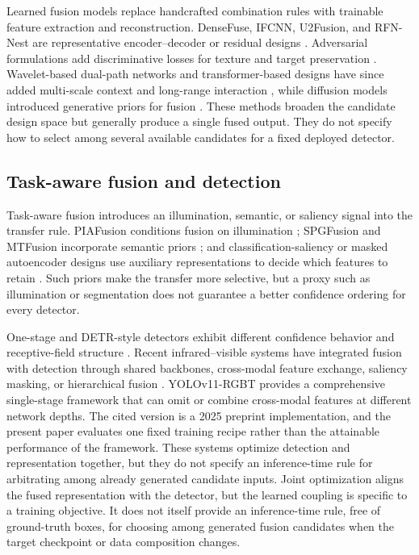 \documentclass[preprint,11pt]{elsarticle}
\begin{document}
Learned fusion models replace handcrafted combination rules with trainable
feature extraction and reconstruction. DenseFuse, IFCNN, U2Fusion, and RFN-Nest
are representative encoder--decoder or residual designs
\cite{li2019densefuse,zhang2020,xu2022u2fusion,li2021rfn}. Adversarial
formulations add discriminative losses for texture and target preservation
\cite{ma2019fusiongan,hou2021ssgan,yi2021dfpgan,song2022tdgan}.
Wavelet-based dual-path networks and transformer-based designs have since added
multi-scale context and long-range interaction
\cite{liu2023dualpath,hao2022vdfefuse,yang2023dglt,an2024mras}, while diffusion
models introduced generative priors for fusion \cite{yi2024diffif,yang2025lfdt}.
These methods broaden the candidate design space but generally produce a single
fused output. They do not specify how to select among several available
candidates for a fixed deployed detector.

\subsection{Task-aware fusion and detection}

Task-aware fusion introduces an illumination, semantic, or saliency signal into
the transfer rule. PIAFusion conditions fusion on illumination
\cite{tang2022}; SPGFusion and MTFusion incorporate semantic priors
\cite{zhang2026,zhou2026mtfusion}; and classification-saliency or masked
autoencoder designs use auxiliary representations to decide which features to
retain \cite{xu2021classsaliency,wang2025smae}. Such priors make the transfer
more selective, but a proxy such as illumination or segmentation does not
guarantee a better confidence ordering for every detector.

One-stage and DETR-style detectors exhibit different confidence behavior and
receptive-field structure \cite{redmon2016yolo,wang2024yolov9,wang2024yolov10,zhao2024rtdetr}.
Recent infrared--visible systems have integrated fusion with detection through shared
backbones, cross-modal feature exchange, saliency masking, or hierarchical
fusion \cite{zhao2025cmifdf,gao2026coifsd,an2026mrtdetr,zhang2026hffn,wan2025yolo11rgbt,xiang2025unifusod,yue2022lowlight}.
YOLOv11-RGBT provides a comprehensive single-stage framework that can omit or
combine cross-modal features at different network depths. The cited version is
a 2025 preprint implementation, and the present paper evaluates one fixed
training recipe rather than the attainable performance of the framework. These
systems optimize detection and representation together, but they do not specify
an inference-time rule for arbitrating among already generated candidate inputs.
Joint optimization aligns the fused representation with the detector, but the
learned coupling is specific to a training objective. It does not itself
provide an inference-time rule, free of ground-truth boxes, for choosing among generated
fusion candidates when the target checkpoint or data composition changes.
\end{document}
